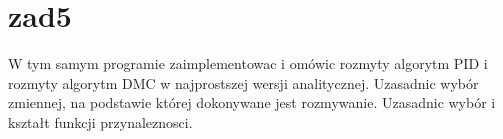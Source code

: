 \section{zad5}
\label{projekt:zad5}


W tym samym programie zaimplementowac i omówic rozmyty algorytm PID i rozmyty
algorytm DMC w najprostszej wersji analitycznej. Uzasadnic wybór zmiennej,
na podstawie której dokonywane jest rozmywanie. Uzasadnic wybór i kształt funkcji
przynaleznosci.

%    



\newpage
